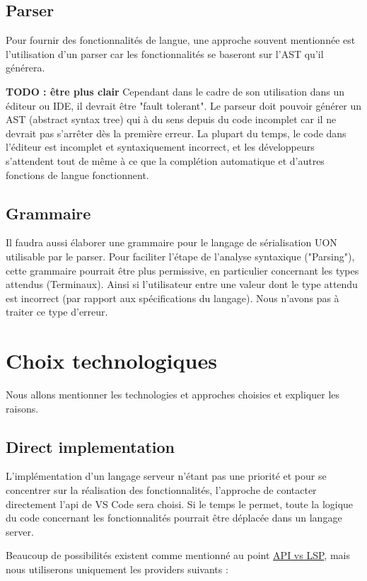 \documentclass[
    iict, %
    il, %
]{heig-tb}
\begin{document}
\subsection{Parser}
Pour fournir des fonctionnalités de langue, une approche souvent mentionnée est l'utilisation d'un parser
car les fonctionnalités se baseront sur l'AST qu'il générera.

\textbf{TODO : être plus clair}
Cependant dans le cadre de son utilisation dans un éditeur ou IDE, il devrait être "fault tolerant". Le parseur doit pouvoir générer un AST (abstract syntax tree) qui à du sens depuis du code incomplet
car il ne devrait pas s'arrêter dès la première erreur.
La plupart du temps, le code dans l'éditeur est incomplet et syntaxiquement incorrect, et les développeurs s'attendent tout de même à ce que la complétion automatique et d'autres fonctions de langue fonctionnent.

\subsection{Grammaire}
Il faudra aussi élaborer une grammaire pour le langage de sérialisation UON utilisable par le parser.
Pour faciliter l'étape de l'analyse syntaxique ("Parsing"), cette grammaire pourrait être plus permissive, en particulier concernant les types attendus (Terminaux).
Ainsi si l'utilisateur entre une valeur dont le type attendu est incorrect (par rapport aux spécifications du langage). Nous n'avons pas à traiter ce type d'erreur.

\section{Choix technologiques}
Nous allons mentionner les technologies et approches choisies et expliquer les raisons.

\subsection{Direct implementation}
L'implémentation d'un langage serveur n'étant pas une priorité et pour se concentrer sur la réalisation des fonctionnalités, l'approche de contacter directement l'api de VS Code sera choisi.
Si le temps le permet, toute la logique du code concernant les fonctionnalités pourrait être déplacée dans un langage server.

Beaucoup de possibilités existent comme mentionné au point \hyperref[api vs lsp]{API vs LSP}, mais nous utiliserons uniquement les providers suivants :
\end{document}
